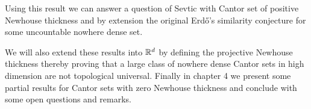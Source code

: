 Using this result we can answer a question of Sevtic\cite{Svetic} with Cantor set of positive Newhouse thickness and by extension the original Erd\H{o}'s similarity conjecture for some uncountable nowhere dense set. 

\medskip

We will also extend these results into $\mathbb{R}^d$ by defining the projective Newhouse thickness thereby proving that a large class of nowhere dense Cantor sets in high dimension are not topological universal.   Finally in chapter 4 we present some partial results for Cantor sets with zero Newhouse thickness and conclude with some open questions and remarks.  


